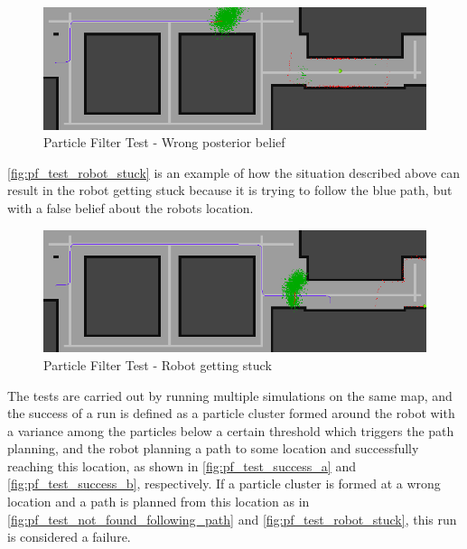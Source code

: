 \begin{figure}[H]
\centering
\includegraphics[scale=0.45]{images/pf_test_not_found_following_path}
\caption{Particle Filter Test - Wrong posterior belief}
\label{fig:pf_test_not_found_following_path}
\end{figure}

\autoref{fig:pf_test_robot_stuck} is an example of how the situation described above can result in the robot getting stuck because it is trying to follow the blue path, but with a false belief about the robots location.

\begin{figure}[H]
\centering
\includegraphics[scale=0.45]{images/pf_test_robot_stuck}
\caption{Particle Filter Test - Robot getting stuck}
\label{fig:pf_test_robot_stuck}
\end{figure}

The tests are carried out by running multiple simulations on the same map, and the success of a run is defined as a particle cluster formed around the robot with a variance among the particles below a certain threshold which triggers the path planning, and the robot planning a path to some location and successfully reaching this location, as shown in \autoref{fig:pf_test_success_a} and \ref{fig:pf_test_success_b}, respectively. If a particle cluster is formed at a wrong location and a path is planned from this location as in \autoref{fig:pf_test_not_found_following_path} and \autoref{fig:pf_test_robot_stuck}, this run is considered a failure.\\

